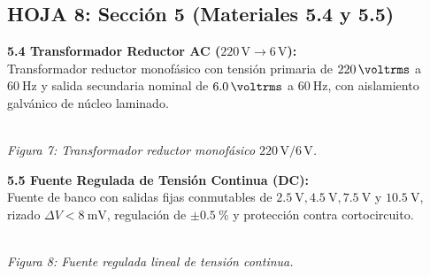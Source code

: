 \documentclass[a4paper, 11pt]{article}
\begin{document}
\newpage

\subsection*{\color{uni-blue} HOJA 8: Sección 5 (Materiales 5.4 y 5.5)}
\begin{tcolorbox}[title=Texto a Escribir: Material 5.4 (Transformador Reductor), colframe=black]
    \small
    \textbf{5.4 Transformador Reductor AC ($220\,\unit{\volt} \to 6\,\unit{\volt}$):}\\[0.15cm]
    Transformador reductor monofásico con tensión primaria de $\qty{220}{\voltrms}$ a $\qty{60}{\hertz}$ y salida secundaria nominal de $\qty{6,0}{\voltrms}$ a $\qty{60}{\hertz}$, con aislamiento galvánico de núcleo laminado.\\[0.2cm]
    \begin{center}
        \\[0.1cm]
        {\scriptsize\textit{Figura 7: Transformador reductor monofásico $220\,\text{V}/6\,\text{V}$.}}
    \end{center}
\end{tcolorbox}

\vspace{0.2cm}

\begin{tcolorbox}[title=Texto a Escribir: Material 5.5 (Fuente DC Regulada), colframe=black]
    \small
    \textbf{5.5 Fuente Regulada de Tensión Continua (DC):}\\[0.15cm]
    Fuente de banco con salidas fijas conmutables de $\qty{2,5}{\volt}, \qty{4,5}{\volt}, \qty{7,5}{\volt}$ y $\qty{10,5}{\volt}$, rizado $\Delta V < \qty{8}{\milli\volt}$, regulación de $\pm\qty{0,5}{\percent}$ y protección contra cortocircuito.\\[0.2cm]
    \begin{center}
        \\[0.1cm]
        {\scriptsize\textit{Figura 8: Fuente regulada lineal de tensión continua.}}
    \end{center}
\end{tcolorbox}
\end{document}
